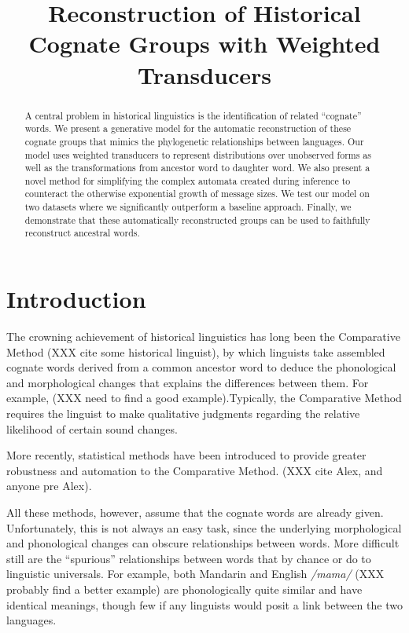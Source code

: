 \documentclass[11pt,a4paper]{article}
\title{Reconstruction of Historical Cognate Groups with Weighted Transducers}
\author{}
\date{}
\begin{document}
\maketitle
\begin{abstract}
  \normalsize
  A central problem in historical linguistics is the identification
  of related ``cognate'' words. We present a generative model for
  the automatic reconstruction of these cognate groups that mimics
  the phylogenetic relationships between languages. Our model uses
  weighted transducers to represent distributions over unobserved
  forms as well as the transformations from ancestor word to daughter
  word. We also present a novel method for simplifying the complex
  automata created during inference to counteract the otherwise
  exponential growth of message sizes. We test our model on two
  datasets where we significantly outperform a baseline approach.
  Finally, we demonstrate that these automatically reconstructed
  groups can be used to faithfully reconstruct ancestral words.
\end{abstract}
\section{Introduction}

The crowning achievement of historical linguistics has long been
the Comparative Method (XXX cite some historical linguist), by which
linguists take assembled cognate words derived from a common ancestor
word to deduce the phonological and morphological changes that
explains the differences between them. For example, (XXX need to
find a good example).Typically, the Comparative Method requires
the linguist to make qualitative judgments regarding the relative
likelihood of certain sound changes.

More recently, statistical methods have been introduced to provide
greater robustness and automation to the Comparative Method. (XXX cite
Alex, and anyone pre Alex). 

All these methods, however, assume that the cognate words are already
given. Unfortunately, this is not always an easy task, since the
underlying morphological and phonological changes can obscure
relationships between words.  More difficult still are the ``spurious''
relationships between words that by chance or do to linguistic
universals. For example, both Mandarin and English \textit{/mama/}
(XXX probably find a better example) are phonologically quite similar
and have identical meanings, though few if any linguists would posit
a link between the two languages.
\end{document}
